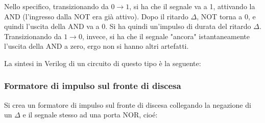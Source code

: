 \documentclass[a4paper,11pt]{article}
\begin{document}
Nello specifico, transizionando da $0 \rightarrow 1$, si ha che il segnale va a 1, attivando la AND (l'ingresso dalla NOT era già attivo). 
Dopo il ritardo $\Delta$, NOT torna a 0, e quindi l'uscita della AND va a 0.
Si ha quindi un'impulso di durata del ritardo $\Delta$.
Transizionando da $1 \rightarrow 0$, invece, si ha che il segnale "ancora" istantaneamente l'uscita della AND a zero, ergo non si hanno altri artefatti.

La sintesi in Verilog di un circuito di questo tipo è la seguente:



\subsubsection{Formatore di impulso sul fronte di discesa}
Si crea un formatore di impulso sul fronte di discesa collegando la negazione di un $\Delta$ e il segnale stesso ad una porta NOR, cioé:
\end{document}
